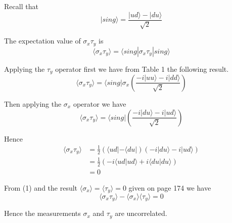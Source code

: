 


\bigskip
Recall that
\begin{equation*}
|sing\rangle=\frac{|ud\rangle-|du\rangle}{\sqrt2}
\end{equation*}

The expectation value of $\sigma_x\tau_y$ is
\begin{equation*}
\langle\sigma_x\tau_y\rangle=\langle sing|\sigma_x\tau_y|sing\rangle
\end{equation*}

Applying the $\tau_y$ operator first we have from Table 1 the following result.
\begin{equation*}
\langle\sigma_x\tau_y\rangle=\langle sing|\sigma_x
\left(\frac{-i|uu\rangle-i|dd\rangle}{\sqrt2}\right)
\end{equation*}

Then applying the $\sigma_x$ operator we have
\begin{equation*}
\langle\sigma_x\tau_y\rangle=\langle sing|\left(\frac{-i|du\rangle-i|ud\rangle}{\sqrt2}\right)
\end{equation*}

Hence
\begin{align*}
\langle\sigma_x\tau_y\rangle
&=\frac{1}{2}
\left(\langle ud|-\langle du|\right)
\left(-i|du\rangle-i|ud\rangle\right)
\\[1ex]
&=\frac{1}{2}\left(-i\langle ud|ud\rangle+i\langle du|du\rangle\right)
\\[1ex]
&=0\tag{1}
\end{align*}

From (1) and the result $\langle\sigma_x\rangle=\langle\tau_y\rangle=0$ given on page 174 we have
\begin{equation*}
\langle\sigma_x\tau_y\rangle-\langle\sigma_x\rangle\langle\tau_y\rangle=0
\end{equation*}

Hence the measurements $\sigma_x$ and $\tau_y$ are uncorrelated.


